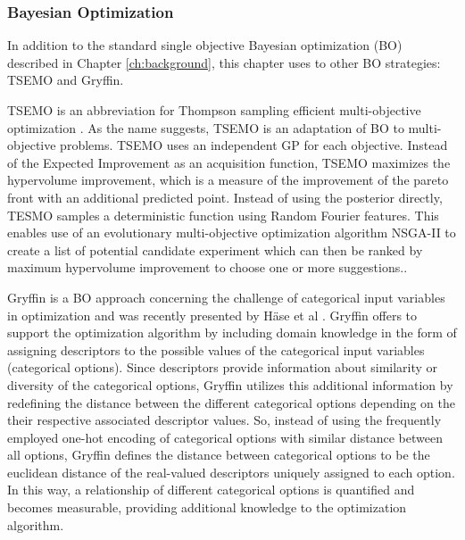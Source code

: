 \subsubsection{Bayesian Optimization}

In addition to the standard single objective Bayesian optimization (BO) described in Chapter \ref{ch:background}, this chapter uses to other BO strategies: TSEMO and Gryffin.

TSEMO is an abbreviation for Thompson sampling efficient multi-objective optimization \cite{Bradford2018}. As the name suggests, TSEMO is an adaptation of BO to multi-objective problems. TSEMO uses an independent GP for each objective. Instead of the Expected Improvement as an acquisition function, TSEMO maximizes the hypervolume improvement, which is a measure of the improvement of the pareto front with an additional predicted point. Instead of using the posterior directly, TESMO samples a deterministic function using Random Fourier features. This enables use of an evolutionary multi-objective optimization algorithm NSGA-II \cite{Deb2002} to create a list of potential candidate experiment which can then be ranked by maximum hypervolume improvement to choose one or more suggestions..

Gryffin is a BO approach concerning the challenge of categorical input variables in optimization and was recently presented by H{\"{a}}se et al \cite{Hase2020a}. Gryffin offers to support the optimization algorithm by including domain knowledge in the form of assigning descriptors to the possible values of the categorical input variables (categorical options). Since descriptors provide information about similarity or diversity of the categorical options, Gryffin utilizes this additional information by redefining the distance between the different categorical options depending on the their respective associated descriptor values. So, instead of using the frequently employed one-hot encoding of categorical options with similar distance between all options,  Gryffin defines the distance between categorical options to be the euclidean distance of the real-valued descriptors uniquely assigned to each option. In this way, a relationship of different categorical options is quantified and becomes measurable, providing additional knowledge to the optimization algorithm. 


